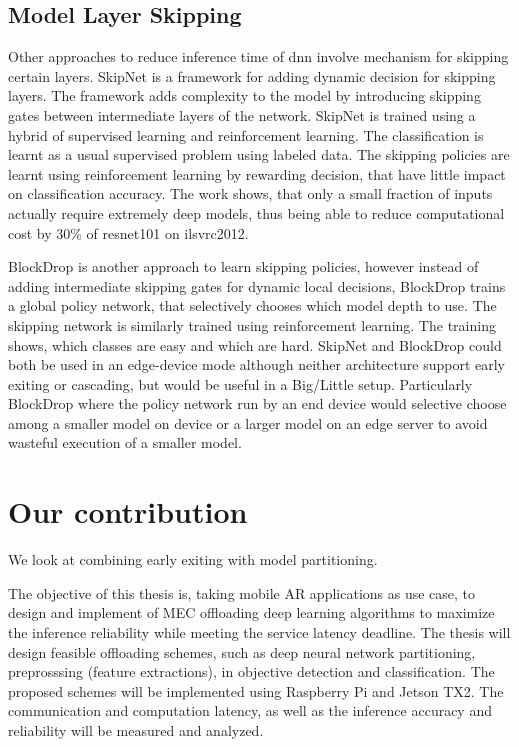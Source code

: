 \subsection{Model Layer Skipping}

Other approaches to reduce inference time of \gls{dnn} involve mechanism for skipping certain layers. SkipNet \cite{wang_skipnet:_2017} is a framework for adding dynamic decision for skipping layers. The framework adds complexity to the model by introducing skipping gates between intermediate layers of the network. SkipNet is trained using a hybrid of supervised learning and reinforcement learning. The classification is learnt as a usual supervised problem using labeled data. The skipping policies are learnt using reinforcement learning by rewarding decision, that have little impact on classification accuracy. The work shows, that only a small fraction of inputs actually require extremely deep models, thus being able to reduce computational cost by 30\% of \gls{resnet}101 on \gls{ilsvrc2012}. 

BlockDrop \cite{wu_blockdrop:_2017} is another approach to learn skipping policies, however instead of adding intermediate skipping gates for dynamic local decisions, BlockDrop trains a global policy network, that selectively chooses which model depth to use. The skipping network is similarly trained using reinforcement learning. The training shows, which classes are easy and which are hard. SkipNet and BlockDrop could both be used in an edge-device mode although neither architecture support early exiting or cascading, but would be useful in a Big/Little \cite{park_big/little_2015} setup. Particularly BlockDrop where the policy network run by an end device would selective choose among a smaller model on device or a larger model on an edge server to avoid wasteful execution of a smaller model.

\section{Our contribution}

We look at combining early exiting with model partitioning. 

The objective of this thesis is, taking mobile AR applications as use case, to design and implement of MEC offloading deep learning algorithms to maximize the inference reliability while meeting the service latency deadline. The thesis will design feasible offloading schemes, such as deep neural network partitioning, preprosssing (feature extractions), in objective detection and classification. The proposed schemes will be implemented using Raspberry Pi and Jetson TX2. The communication and computation latency, as well as the inference accuracy and reliability will be measured and analyzed.